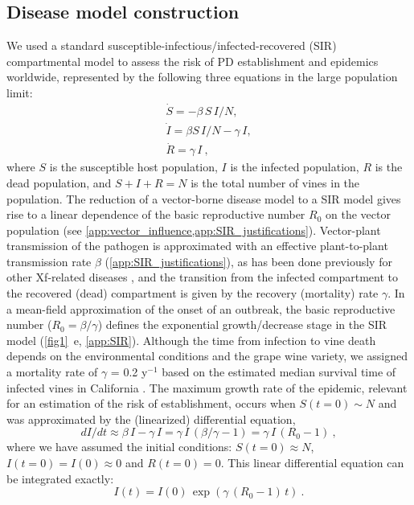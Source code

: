 \subsection{Disease model construction}

We used a standard susceptible-infectious/infected-recovered (SIR)
compartmental model to assess the risk of PD establishment and epidemics
worldwide, represented by the following three equations in the large population
limit:
\begin{equation}
    \begin{array}{l}
        \dot{S}=-\beta \, S \, I/N ,         \\
        \dot{I}=\beta S\, I/N - \gamma\,  I, \\
        \dot{R}=\gamma \, I \ ,
    \end{array}
    \label{eq:SIRmodel}
\end{equation}
where $S$ is the susceptible host population, $I$ is the infected
population, $R$ is the dead population, and $S+I+R=N$ is the total number of
vines in the population. The reduction of a vector-borne disease model to a
SIR model gives rise to a linear dependence of the basic reproductive number
$R_0$ on the vector population (see
\cref{app:vector_influence,app:SIR_justifications}).
Vector-plant transmission of the pathogen is approximated with an effective
plant-to-plant transmission rate $\beta$ (\cref{app:SIR_justifications}), as
has been done previously for other Xf-related diseases \cite{White2020}, and
the transition from the infected compartment to the recovered (dead)
compartment is given by the recovery (mortality) rate $\gamma$.  In a
mean-field approximation of the onset of an outbreak, the basic reproductive
number ($R_0=\beta/\gamma$) defines the exponential growth/decrease stage in
the SIR model (\cref{fig1}~\textcolor{ref_color}{e}, \cref{app:SIR}). Although
the time from infection
to vine death depends on the environmental conditions and the grape wine
variety, we assigned a mortality rate of $\gamma$ = 0.2 y$^{-1}$  based on the
estimated median survival time of infected vines in California
\cite{Almeida2003}. The maximum growth rate of the epidemic, relevant for an
estimation of the risk of establishment, occurs when $S(t=0)\sim N$ and was
approximated by the (linearized) differential equation,
\begin{equation}
    dI/dt \approx \beta \, I-\gamma \, I = \gamma\,  I\, (\beta/\gamma -
    1)=\gamma \, I\, (R_0-1) \ ,
\end{equation}
where we have assumed the initial conditions:
$S(t= 0)\approx N$, $I(t = 0)= I(0) \approx0$ and $R(t = 0)=0$. This linear
differential equation can be integrated exactly:
\begin{equation}\label{eq:infect_proc}
    I(t)=I(0)\, \exp(\gamma\, (R_0-1)\, t) \ .
\end{equation}

